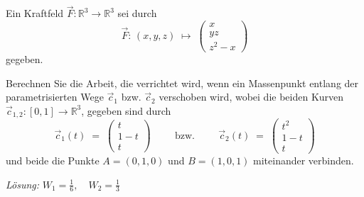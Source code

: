\begin{ueb}
    {}{}
    Ein Kraftfeld $\vec{F}:\mathbb{R}^3\longrightarrow \mathbb{R}^3$ sei durch
$$\vec{F} : \, (x,y,z) \; \longmapsto \; 
\left( \begin{array}{c}
x \\
yz \\
z^2-x
\end{array}\right) $$
gegeben. 


Berechnen Sie die Arbeit, die verrichtet wird, wenn ein Massenpunkt entlang der parametrisierten Wege $\vec{c}_1$ bzw. $\vec{c}_2$ verschoben wird, wobei die beiden Kurven $\vec{c}_{1,2}:[0,1]\longrightarrow \mathbb{R}^3$, gegeben sind durch
$$\vec{c}_1(t) \; = \; \left( \begin{array}{c}
t \\
1-t \\
t
\end{array}\right) 
\hspace{1cm} \mbox{bzw.} \hspace{1cm}
\vec{c}_2(t) \; = \; \left( \begin{array}{c}
t^2 \\
1-t \\
t
\end{array}\right) $$
und beide die Punkte $A=(0,1,0)$ und $B=(1,0,1)$ miteinander verbinden.
\end{ueb}

\emph{Lösung:} $W_1 = \frac{1}{6}, \quad W_2 = \frac{1}{3}$









